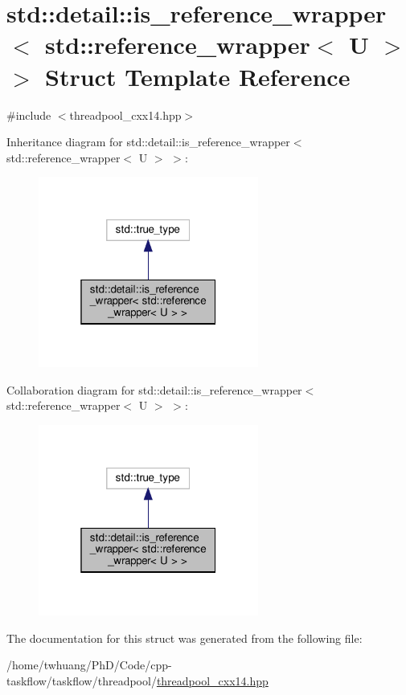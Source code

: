 \hypertarget{structstd_1_1detail_1_1is__reference__wrapper_3_01std_1_1reference__wrapper_3_01U_01_4_01_4}{}\section{std\+:\+:detail\+:\+:is\+\_\+reference\+\_\+wrapper$<$ std\+:\+:reference\+\_\+wrapper$<$ U $>$ $>$ Struct Template Reference}
\label{structstd_1_1detail_1_1is__reference__wrapper_3_01std_1_1reference__wrapper_3_01U_01_4_01_4}


{\ttfamily \#include $<$threadpool\+\_\+cxx14.\+hpp$>$}



Inheritance diagram for std\+:\+:detail\+:\+:is\+\_\+reference\+\_\+wrapper$<$ std\+:\+:reference\+\_\+wrapper$<$ U $>$ $>$\+:\nopagebreak
\begin{figure}[H]
\begin{center}
\leavevmode
\includegraphics[width=205pt]{structstd_1_1detail_1_1is__reference__wrapper_3_01std_1_1reference__wrapper_3_01U_01_4_01_4__inherit__graph}
\end{center}
\end{figure}


Collaboration diagram for std\+:\+:detail\+:\+:is\+\_\+reference\+\_\+wrapper$<$ std\+:\+:reference\+\_\+wrapper$<$ U $>$ $>$\+:\nopagebreak
\begin{figure}[H]
\begin{center}
\leavevmode
\includegraphics[width=205pt]{structstd_1_1detail_1_1is__reference__wrapper_3_01std_1_1reference__wrapper_3_01U_01_4_01_4__coll__graph}
\end{center}
\end{figure}


The documentation for this struct was generated from the following file\+:\begin{DoxyCompactItemize}
\item 
/home/twhuang/\+Ph\+D/\+Code/cpp-\/taskflow/taskflow/threadpool/\hyperlink{threadpool__cxx14_8hpp}{threadpool\+\_\+cxx14.\+hpp}\end{DoxyCompactItemize}
